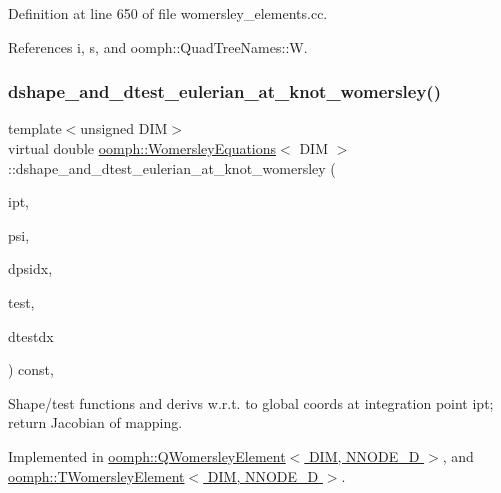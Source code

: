 Definition at line 650 of file womersley\+\_\+elements.\+cc.



References i, s, and oomph\+::\+Quad\+Tree\+Names\+::W.

\mbox{\label{classoomph_1_1WomersleyEquations_a5f8bd506dbebc304f30f86ef4acfbd9d}} 
\subsubsection{\texorpdfstring{dshape\+\_\+and\+\_\+dtest\+\_\+eulerian\+\_\+at\+\_\+knot\+\_\+womersley()}{dshape\_and\_dtest\_eulerian\_at\_knot\_womersley()}}
{\footnotesize\ttfamily template$<$unsigned D\+IM$>$ \\
virtual double \hyperlink{classoomph_1_1WomersleyEquations}{oomph\+::\+Womersley\+Equations}$<$ D\+IM $>$\+::dshape\+\_\+and\+\_\+dtest\+\_\+eulerian\+\_\+at\+\_\+knot\+\_\+womersley (\begin{DoxyParamCaption}\item[{const unsigned \&}]{ipt,  }\item[{\hyperlink{classoomph_1_1Shape}{Shape} \&}]{psi,  }\item[{\hyperlink{classoomph_1_1DShape}{D\+Shape} \&}]{dpsidx,  }\item[{\hyperlink{classoomph_1_1Shape}{Shape} \&}]{test,  }\item[{\hyperlink{classoomph_1_1DShape}{D\+Shape} \&}]{dtestdx }\end{DoxyParamCaption}) const\hspace{0.3cm}{\ttfamily [protected]}, {}}



Shape/test functions and derivs w.\+r.\+t. to global coords at integration point ipt; return Jacobian of mapping. 



Implemented in \hyperlink{classoomph_1_1QWomersleyElement_a5c4db93fb861995c7910ffe44751f449}{oomph\+::\+Q\+Womersley\+Element$<$ D\+I\+M, N\+N\+O\+D\+E\+\_\+D $>$}, and \hyperlink{classoomph_1_1TWomersleyElement_a497b00b2f011802e86fa8a0ad45546e7}{oomph\+::\+T\+Womersley\+Element$<$ D\+I\+M, N\+N\+O\+D\+E\+\_\+D $>$}.

